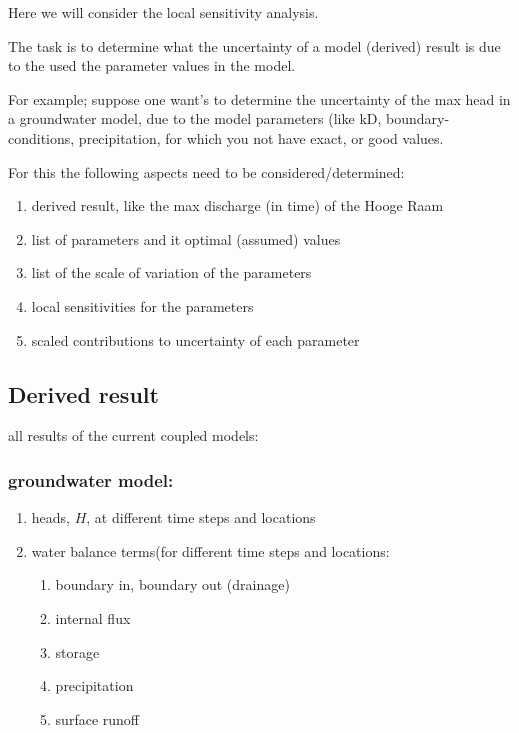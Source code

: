 \documentclass[
]{article}
\begin{document}
Here we will consider the local sensitivity analysis.

The task is to determine what the uncertainty of a model (derived)
result is due to the used the parameter values in the model.

For example; suppose one want's to determine the uncertainty of the max
head in a groundwater model, due to the model parameters (like kD,
boundary-conditions, precipitation, for which you not have exact, or
good values.

For this the following aspects need to be considered/determined:

\begin{enumerate}
\def\labelenumi{\arabic{enumi}.}
\item
  derived result, like the max discharge (in time) of the Hooge Raam
\item
  list of parameters and it optimal (assumed) values
\item
  list of the scale of variation of the parameters
\item
  local sensitivities for the parameters
\item
  scaled contributions to uncertainty of each parameter
\end{enumerate}

\hypertarget{derived-result}{%
\subsection{Derived result}\label{derived-result}}

all results of the current coupled models:

\hypertarget{groundwater-model}{%
\subsubsection{groundwater model:}\label{groundwater-model}}

\begin{enumerate}
\def\labelenumi{\arabic{enumi}.}
\item
  heads, \(H\), at different time steps and locations
\item
  water balance terms(for different time steps and locations:

  \begin{enumerate}
  \def\labelenumii{\arabic{enumii}.}
  \item
    boundary in, boundary out (drainage)
  \item
    internal flux
  \item
    storage
  \item
    precipitation
  \item
    surface runoff
  \end{enumerate}
\end{enumerate}
\end{document}
